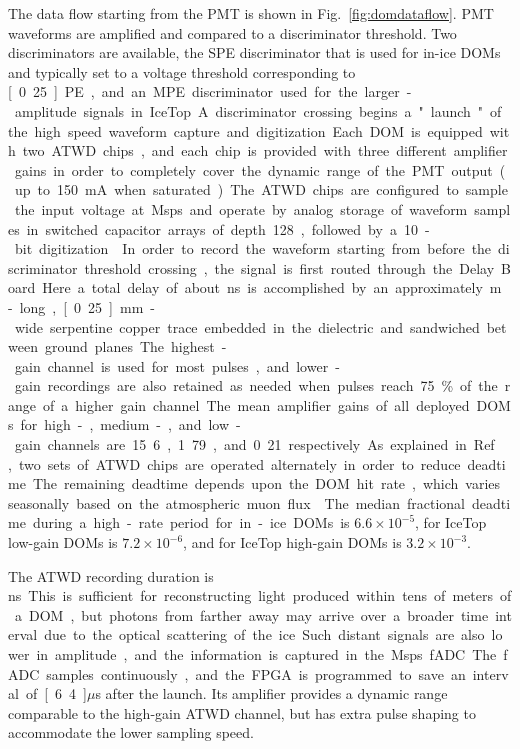 The data flow starting from the PMT is shown in Fig.~\ref{fig:domdataflow}.
PMT waveforms are amplified and compared to a discriminator threshold.  Two
discriminators are available, the SPE discriminator that is used for in-ice DOMs
and typically set to a voltage threshold corresponding to \unit[0.25]PE,
and an MPE discriminator used for the larger-amplitude signals in IceTop.
A discriminator crossing begins a "launch" of the high speed waveform
capture and digitization. Each DOM is equipped with two ATWD chips,
and each chip is provided with three different amplifier
gains in order to completely cover the 
dynamic range of the PMT output (up to 150~mA when saturated). 
The ATWD chips are configured to sample the input voltage at \unit[300]Msps
and operate by analog storage of waveform samples in switched capacitor arrays of depth 128,
followed by a 10-bit digitization \cite{atwd}.  In order to record the waveform starting from before the discriminator
threshold crossing, the signal is first routed through the Delay Board.  Here a total delay of about
\unit[75]ns is accomplished by an approximately \unit[10]m-long, \unit[0.25]mm-wide
serpentine copper trace embedded in the dielectric and sandwiched between
ground planes.  The highest-gain channel is used
for most pulses, and lower-gain recordings are also retained as needed when pulses reach 75\% of the range 
of a higher gain channel.  The mean amplifier gains of all deployed DOMs for high-,
medium-, and low-gain channels are 15.6, 1.79, and 0.21 respectively.


As explained in Ref.~\cite{ICECUBE:DAQ}, two sets of ATWD chips are operated alternately in order to
reduce deadtime.  The remaining deadtime depends upon the DOM hit
rate, which varies seasonally based on the atmospheric muon flux~\cite{ICECUBE:IceTop}. 
The median fractional deadtime during a high-rate period for in-ice DOMs
is $6.6\times10^{-5}$, for IceTop low-gain DOMs is $7.2\times 10^{-6}$, and
for IceTop high-gain DOMs is $3.2 \times 10^{-3}$.  

The ATWD recording duration is \unit[427]ns.  This is sufficient for
reconstructing light produced within tens of meters of
a DOM, but photons from farther away may arrive over a broader time
interval due to the optical scattering of the ice.  Such distant signals are
also lower in amplitude, and the information is captured in the \unit[40]Msps fADC.
The fADC samples continuously, and the FPGA is programmed to save an
interval of \unit[6.4]$\mu$s after the launch. Its amplifier provides a
dynamic range comparable to the high-gain ATWD channel, but has extra pulse shaping to accommodate the lower
sampling speed.

